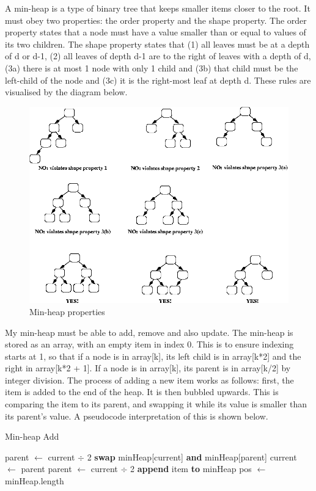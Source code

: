 \documentclass[titlepage]{article}
\begin{document}
A min-heap is a type of binary tree that keeps smaller items closer to the root. It must obey two properties: the order property and the shape property. The order property states that a node must have a value smaller than or equal to values of its two children. The shape property states that (1) all leaves must be at a depth of d or d-1, (2) all leaves of depth d-1 are to the right of leaves with a depth of d, (3a) there is at most 1 node with only 1 child and (3b) that child must be the left-child of the node and (3c) it is the right-most leaf at depth d. These rules are visualised by the diagram below.

\begin{figure}[H]
  \centering
  \includegraphics[width=12cm]{maxheap.png}
  \caption{Min-heap properties}
  \label{fig:dijk}
\end{figure}

My min-heap must be able to add, remove and also update. The min-heap is stored as an array, with an empty item in index 0. This is to ensure indexing starts at 1, so that if a node is in array[k], its left child is in array[k*2] and the right in array[k*2 + 1]. If a node is in array[k], its parent is in array[k/2] by integer division. The process of adding a new item works as follows: first, the item is added to the end of the heap. It is then bubbled upwards. This is comparing the item to its parent, and swapping it while its value is smaller than its parent's value. A pseudocode interpretation of this is shown below.

\begin{algorithm}[H]
\caption{Min-heap Add}
\begin{algorithmic}[1]
	\State parent $\gets$ current $\div$ 2
		\State \textbf{swap} minHeap[current] \textbf{and} minHeap[parent]
		\State current $\gets$ parent
		\State parent $\gets$ current $\div$ 2
	\EndWhile
	\EndProcedure
	\State
		\State \textbf{append} item \textbf{to} minHeap
		\State pos $\gets$ minHeap.length
		\State {}
	\EndProcedure
\end{algorithmic}
\end{algorithm}
\end{document}
